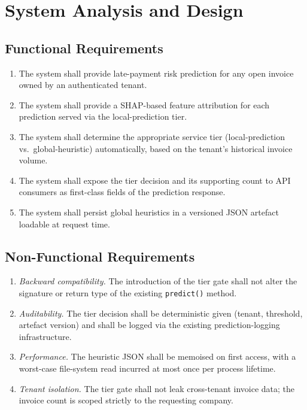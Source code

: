 \chapter{System Analysis and Design}
\label{ch:system_design}

\section{Functional Requirements}
\label{sec:design_functional}

\begin{enumerate}[label=\textbf{FR\arabic*:}]
  \item The system shall provide late-payment risk prediction for any open invoice owned by an authenticated tenant.
  \item The system shall provide a SHAP-based feature attribution for each prediction served via the local-prediction tier.
  \item The system shall determine the appropriate service tier (local-prediction vs.\ global-heuristic) automatically, based on the tenant's historical invoice volume.
  \item The system shall expose the tier decision and its supporting count to API consumers as first-class fields of the prediction response.
  \item The system shall persist global heuristics in a versioned JSON artefact loadable at request time.
\end{enumerate}

\section{Non-Functional Requirements}
\label{sec:design_nonfunctional}

\begin{enumerate}[label=\textbf{NFR\arabic*:}]
  \item \emph{Backward compatibility.} The introduction of the tier gate shall not alter the signature or return type of the existing \texttt{predict()} method.
  \item \emph{Auditability.} The tier decision shall be deterministic given (tenant, threshold, artefact version) and shall be logged via the existing prediction-logging infrastructure.
  \item \emph{Performance.} The heuristic JSON shall be memoised on first access, with a worst-case file-system read incurred at most once per process lifetime.
  \item \emph{Tenant isolation.} The tier gate shall not leak cross-tenant invoice data; the invoice count is scoped strictly to the requesting company.
\end{enumerate}

